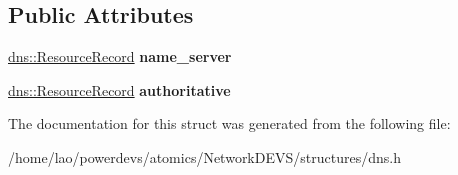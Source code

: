 \subsection*{Public Attributes}
\begin{DoxyCompactItemize}
\item 
\hyperlink{structdns_1_1ResourceRecord}{dns\+::\+Resource\+Record} {\bfseries name\+\_\+server}\hypertarget{structdns_1_1Zone_ae9df275611f589f84e48c2f4bf05c751}{}\label{structdns_1_1Zone_ae9df275611f589f84e48c2f4bf05c751}

\item 
\hyperlink{structdns_1_1ResourceRecord}{dns\+::\+Resource\+Record} {\bfseries authoritative}\hypertarget{structdns_1_1Zone_a11cd8c23701e8f1a7e43d90a5cc51acc}{}\label{structdns_1_1Zone_a11cd8c23701e8f1a7e43d90a5cc51acc}

\end{DoxyCompactItemize}


The documentation for this struct was generated from the following file\+:\begin{DoxyCompactItemize}
\item 
/home/lao/powerdevs/atomics/\+Network\+D\+E\+V\+S/structures/dns.\+h\end{DoxyCompactItemize}
